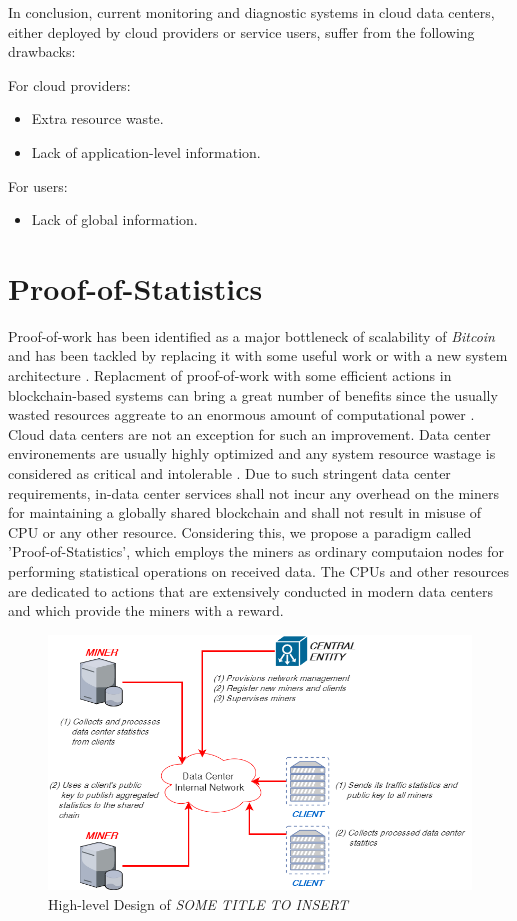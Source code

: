 \documentclass{article}
\newcommand{\projTitle}{SOME TITLE TO INSERT}
\begin{document}
In conclusion, current monitoring and diagnostic systems in cloud data centers, either deployed by cloud providers or service users, suffer from the following drawbacks:

For cloud providers:
\begin{itemize}
	\item Extra resource waste.
	\item Lack of application-level information.
\end{itemize}

For users:
\begin{itemize}
	\item Lack of global information.
\end{itemize}


\section{Proof-of-Statistics}
Proof-of-work has been identified as a major bottleneck of scalability of \textit{Bitcoin}  and has been tackled by replacing it with some useful work \cite{filecoin-storage} or with a new system architecture \cite{RSCoin-bank}.  Replacment of proof-of-work with some
efficient actions in blockchain-based systems can bring a great number of benefits since the usually wasted resources aggreate to an enormous amount of  computational power \cite{bitcoin-comp-elec-power}. Cloud data centers are not an exception for such an
improvement. Data center environements are usually highly optimized and any system resource wastage is considered as critical and intolerable \cite{google-ai-power, facebook-cold-storage-rack}. Due to such stringent data center requirements, in-data center services
shall not incur any overhead on the miners for maintaining a globally shared blockchain and shall not result in misuse of CPU or any other resource. Considering this, we propose a paradigm called 'Proof-of-Statistics', which employs the miners as ordinary computaion nodes
for performing statistical operations on received data. The CPUs and other resources are dedicated to actions that are extensively conducted in modern data centers \cite{microsoft-autopilot} and which provide the miners with a reward.

\begin{figure}[h!]
  \includegraphics[width=0.6\linewidth]{figures/project_design.png}
  \caption{High-level Design of \textit{\projTitle}}
  \label{fig:project_design}
\end{figure}
\end{document}
